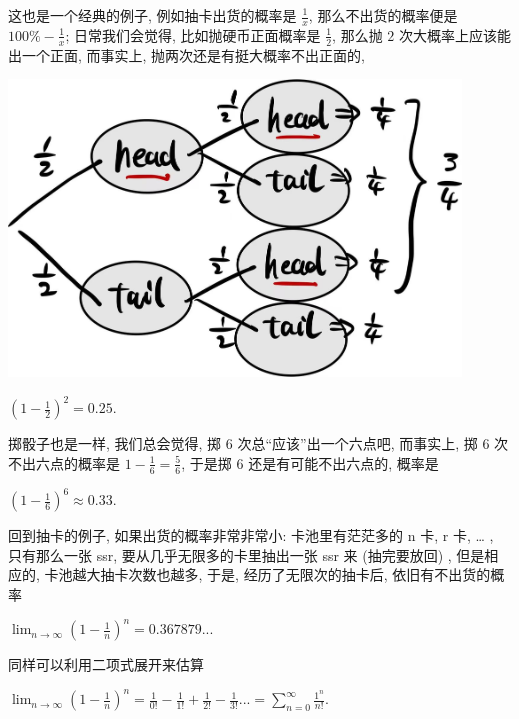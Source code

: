 \begin{tcolorbox}[size=fbox, breakable, enhanced jigsaw, title={抽卡}]

这也是一个经典的例子, 例如抽卡出货的概率是 $\frac{1}{x}$,
那么不出货的概率便是 $100\%-\frac{1}{x}$; 日常我们会觉得,
比如抛硬币正面概率是 $\frac{1}{2}$, 那么抛 $2$
次大概率上应该能出一个正面, 而事实上, 抛两次还是有挺大概率不出正面的,

\begin{tcolorbox}[size=fbox, breakable, enhanced jigsaw, sidebyside]
\includegraphics[width=0.9\textwidth]{img/image-20230410164701991.png}
\tcblower
{}
\end{tcolorbox}

$\left (1-\frac{1}{2}\right)^2=0.25.$

掷骰子也是一样, 我们总会觉得, 掷 $6$ 次总``应该''出一个六点吧,
而事实上, 掷 $6$ 次不出六点的概率是 $1-\frac{1}{6}=\frac{5}{6}$, 于是掷 $6$
还是有可能不出六点的, 概率是

$\left (1-\frac{1}{6}\right)^6\approx0.33.$

回到抽卡的例子, 如果出货的概率非常非常小: 卡池里有茫茫多的 n 卡, r 卡,
\ldots{} , 只有那么一张 ssr, 要从几乎无限多的卡里抽出一张 ssr 来
(抽完要放回) , 但是相应的, 卡池越大抽卡次数也越多, 于是,
经历了无限次的抽卡后, 依旧有不出货的概率

$\lim_{n\rightarrow\infty}\left (1-\frac{1}{n}\right)^n=0.367879...$

同样可以利用二项式展开来估算

$\lim_{n\rightarrow\infty}\left (1-\frac{1}{n}\right)^n=\frac{1}{0!}-\frac{1}{1!}+\frac{1}{2!}-\frac{1}{3!}...=\sum_{n=0}^\infty\frac{1^{n}}{n!}.$


\end{tcolorbox}
